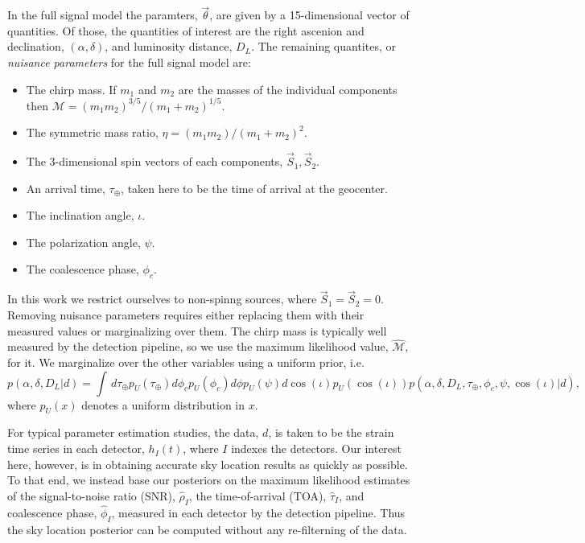 \documentclass{iopart}
\begin{document}
In the full signal model the paramters, $\vec{\theta}$, are given by a 15-dimensional vector of quantities.  Of those, the quantities of interest are the right ascenion and declination, $(\alpha,\delta)$, and luminosity distance, $D_L$.  The remaining quantites, or {\it nuisance parameters} for the full signal model are:
\begin{itemize}
\item The chirp mass.  If $m_1$ and $m_2$ are the masses of the individual components then $\mathcal{M}=(m_1m_2)^{3/5}/(m_1+m_2)^{1/5}$.
\item The symmetric mass ratio, $\eta=(m_1m_2)/(m_1+m_2)^2$.
\item The 3-dimensional spin vectors of each components, $\vec{S}_1,\vec{S}_2$.
\item An arrival time, $\tau_\oplus$, taken here to be the time of arrival at the geocenter.
\item The inclination angle, $\iota$.
\item The polarization angle, $\psi$.
\item The coalescence phase, $\phi_c$.
\end{itemize}
In this work we restrict ourselves to non-spinng sources, where $\vec{S}_1=\vec{S}_2=0$.  Removing nuisance parameters requires either replacing them with their measured values or marginalizing over them.  The chirp mass is typically well measured by the detection pipeline, so we use the maximum likelihood value, $\hat{\mathcal{M}}$, for it.  We marginalize over the other variables using a uniform prior, i.e.
\begin{equation}
p(\alpha,\delta,D_L|d) = \int\, d\tau_\oplus p_U(\tau_\oplus) d\phi_c p_U(\phi_c) d\phi p_U(\psi)  d\cos(\iota) p_U(\cos(\iota)) p(\alpha,\delta,D_L,\tau_\oplus,\phi_c,\psi,\cos(\iota)|d),
\end{equation}
where $p_U(x)$ denotes a uniform distribution in $x$.

For typical parameter estimation studies, the data, $d$, is taken to be the strain time series in each detector, $h_I(t)$, where $I$ indexes the detectors.  Our interest here, however, is in obtaining accurate sky location results as quickly as possible.  To that end, we instead base our posteriors on the maximum likelihood estimates of the signal-to-noise ratio (SNR), $\hat{\rho}_I$, the time-of-arrival (TOA), $\hat{\tau}_I$, and coalescence phase, $\hat{\phi}_I$, measured in each detector by the detection pipeline.  Thus the sky location posterior can be computed without any re-filterning of the data.
\end{document}
